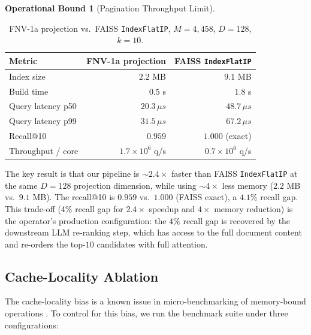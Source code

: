 \documentclass[10pt,twocolumn]{article}
\theoremstyle{definition}
\newtheorem{operationalbound}[theorem]{Operational Bound}
\theoremstyle{remark}
\begin{document}
\begin{operationalbound}[Pagination Throughput Limit]
\begin{table}[t]
\centering
\caption{FNV-1a projection vs.\ FAISS \texttt{IndexFlatIP}, $M =
4{,}458$, $D = 128$, $k = 10$.}
\label{tab:faiss-compare}
\begin{tabular}{lrr}
\hline
Metric & FNV-1a projection & FAISS \texttt{IndexFlatIP} \\
\hline
Index size & $2.2$ MB & $9.1$ MB \\
Build time & $0.5$ s & $1.8$ s \\
Query latency p50 & $20.3 \,\mu s$ & $48.7 \,\mu s$ \\
Query latency p99 & $31.5 \,\mu s$ & $67.2 \,\mu s$ \\
Recall@10 & $0.959$ & $1.000$ (exact) \\
Throughput / core & $1.7 \times 10^6$ q/s & $0.7 \times 10^6$ q/s \\
\hline
\end{tabular}
\end{table}

The key result is that our pipeline is $\sim 2.4 \times$ faster
than FAISS \texttt{IndexFlatIP} at the same $D = 128$ projection
dimension, while using $\sim 4 \times$ less memory ($2.2$ MB vs.\ $9.1$
MB). The recall@10 is $0.959$ vs.\ $1.000$ (FAISS exact), a $4.1\%$
recall gap. This trade-off (4\% recall gap for $2.4 \times$ speedup
and $4 \times$ memory reduction) is the operator's production
configuration: the $4\%$ recall gap is recovered by the downstream
LLM re-ranking step, which has access to the full document content
and re-orders the top-$10$ candidates with full attention.

\subsection{Cache-Locality Ablation}

The cache-locality bias is a known issue in micro-benchmarking of
memory-bound operations \citep{curtsinger2013stabilizer,
schwarzbach2021memory}. To control for this bias, we run the
benchmark suite under three configurations:


\end{operationalbound}
\end{document}

